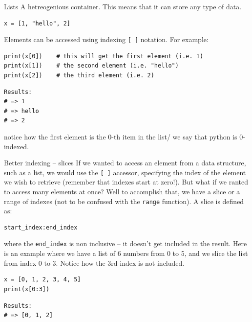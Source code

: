 \documentclass[10pt]{beamer}
\begin{document}
\begin{frame}[label={sec:org8dc9fbb},fragile]{Lists}
 A hetreogenious container. This means that it can store any type of data.

\begin{verbatim}
x = [1, "hello", 2]
\end{verbatim}

Elements can be accessed using indexing \texttt{[ ]} notation. For example:

\begin{verbatim}
print(x[0])    # this will get the first element (i.e. 1)
print(x[1])    # the second element (i.e. "hello")
print(x[2])    # the third element (i.e. 2)
\end{verbatim}

\begin{verbatim}
Results: 
# => 1
# => hello
# => 2
\end{verbatim}


\alert{notice how the first element is the 0-th item in the list/} we say that python is
0-indexed.
\end{frame}

\begin{frame}[label={sec:orgd99e671},fragile]{Better indexing -- slices}
 If we wanted to access an element from a data structure, such as a list, we would use
the \texttt{[ ]} accessor, specifying the index of the element we wish to retrieve (remember
that indexes start at zero!). But what if we ranted to access many elements at once?
Well to accomplish that, we have a slice or a range of indexes (not to be confused
with the \texttt{range} function). A slice is defined as:

\begin{verbatim}
start_index:end_index
\end{verbatim}

where the \texttt{end\_index} is non inclusive -- it doesn't get included in the result. Here
is an example where we have a list of 6 numbers from 0 to 5, and we slice the list from index
0 to 3. Notice how the 3rd index is not included.

\begin{verbatim}
x = [0, 1, 2, 3, 4, 5]
print(x[0:3])
\end{verbatim}

\begin{verbatim}
Results: 
# => [0, 1, 2]
\end{verbatim}
\end{frame}
\end{document}
